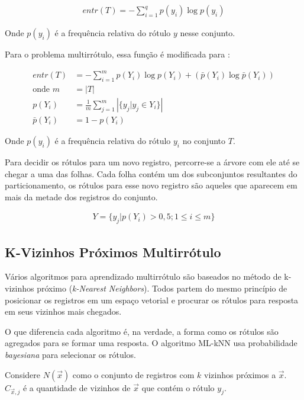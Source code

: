 \documentclass[runningheads,a4paper]{llncs}
\begin{document}
\begin{align*}
	entr(T) = -\sum_{i = 1}^{q} p(y_i) \log p(y_i)
\end{align*}

Onde $p(y_i)$ é a frequência relativa do rótulo $y$ nesse conjunto.

Para o problema multirrótulo, essa função é modificada para \cite{Clare2001-tq}:

\begin{align*}
	entr(T) &= -\sum_{i = 1}^{m} p(Y_i) \log p(Y_i) + (\bar{p}(Y_i) \log \bar{p}(Y_i)) \\
	\text{onde } m &= |T| \\
	p(Y_i) &= \frac{1}{m}\sum_{j = 1}^{m} \left| \{y_j | y_j \in Y_i \} \right| \\
	\bar{p}(Y_i) &= 1 - p(Y_i)
\end{align*}

Onde $p(y_i)$ é a frequência relativa do rótulo $y_i$ no conjunto $T$.

Para decidir os rótulos para um novo registro, percorre-se a árvore com ele até se chegar a uma das folhas. Cada folha contém um dos subconjuntos resultantes do particionamento, os rótulos para esse novo registro são aqueles que aparecem em mais da metade dos registros do conjunto.

\begin{align*}
	Y = \{ y_j | p(Y_i) > 0,5; 1 \leq i \leq m \}
\end{align*}

\subsection{K-Vizinhos Próximos Multirrótulo}\label{sec:todo-k-vizinhos-próximos}

Vários algoritmos para aprendizado multirrótulo são baseados no método de k-vizinhos próximo (\textit{k-Nearest Neighbors}). Todos partem do mesmo princípio de posicionar os registros em um espaço vetorial e procurar os rótulos para resposta em seus vizinhos mais chegados.

O que diferencia cada algoritmo é, na verdade, a forma como os rótulos são agregados para se formar uma resposta. O algoritmo ML-kNN \cite{Zhang2007-id} usa probabilidade \textit{bayesiana} para selecionar os rótulos.

Considere $N(\vec{x})$ como o conjunto de registros com $k$ vizinhos próximos a $\vec{x}$. $C_{\vec{x}, j}$ é a quantidade de vizinhos de $\vec{x}$ que contém o rótulo $y_j$.
\end{document}
